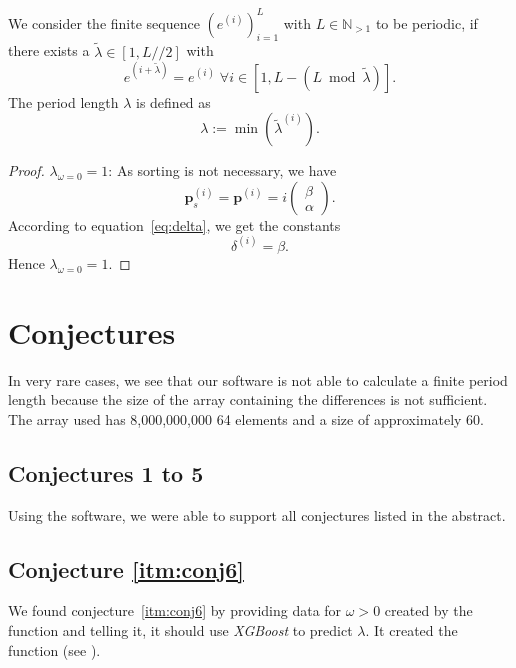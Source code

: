 \documentclass[11pt]{article}
\theoremstyle{remark}
\begin{document}
We consider the finite sequence $\left(e^{(i)}\right)_{i=1}^{L}$ with $L \in \mathbb{N}_{>1}$ to be periodic, if there exists a $\tilde{\lambda} \in [1, L//2]$ with 
%
\begin{equation}
e^{(i+\tilde{\lambda})} = e^{(i)} \; \forall i \in [1, L - (L \bmod \tilde{\lambda})].
\end{equation}
%
The period length $\lambda$ is defined as
%
\begin{equation}
\lambda := \min\left(\tilde{\lambda}^{(i)} \right).
\end{equation}
%
\begin{proof}
$\lambda_{\omega = 0} = 1$: As sorting is not necessary, we have
%
\begin{equation}
\mathbf{p}_s^{(i)} = \mathbf{p}^{(i)} = i \begin{pmatrix} \beta \\ \alpha \end{pmatrix}.
\end{equation}
%
According to equation~\eqref{eq:delta}, we get the constants
\begin{equation}
\delta^{(i)} = \beta.
\end{equation}
%
Hence $\lambda_{\omega = 0} = 1$.
\end{proof}

\section{Conjectures}

In very rare cases, we see that our \langc software is not able to calculate a finite period length because the size of the array containing the differences is not sufficient. The array used has 8,000,000,000 \SI{64}{\bit} elements and a size of approximately \SI{60}{\gigabyte}.

\subsection{Conjectures 1 to 5}

Using the \langc software, we were able to support all conjectures listed in the abstract.

\subsection{Conjecture \ref{itm:conj6}}

We found conjecture~\ref{itm:conj6} by providing \chat data for $\omega > 0$ created by the \langc function  and telling it, it should use \emph{XGBoost} to predict $\lambda$. It created the \langp function  (see \cite{Kunert2025}). 
\end{document}
